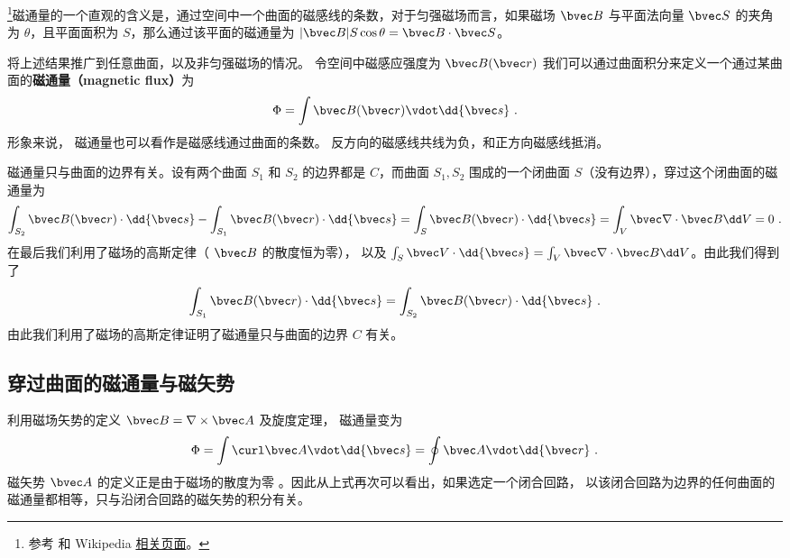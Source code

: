 
\begin{issues}
\issueDraft
{}
\end{issues}


\footnote{参考 \cite{GriffE} 和 Wikipedia \href{https://en.wikipedia.org/wiki/Magnetic_flux}{相关页面}。}磁通量的一个直观的含义是，通过空间中一个曲面的磁感线的条数，对于匀强磁场而言，如果磁场 $\bvec B$ 与平面法向量 $\bvec S$ 的夹角为 $\theta$，且平面面积为 $S$，那么通过该平面的磁通量为 $|\bvec B|S \cos\theta = \bvec B\cdot \bvec S$。

将上述结果推广到任意曲面，以及非匀强磁场的情况。
令空间中磁感应强度为 $\bvec B(\bvec r)$ 我们可以通过曲面积分来定义一个通过某曲面的\textbf{磁通量（magnetic flux）}为
\begin{equation}
\Phi  = \int \bvec B(\bvec r) \vdot \dd{\bvec s}~.
\end{equation}
形象来说， 磁通量也可以看作是磁感线通过曲面的条数。 反方向的磁感线共线为负，和正方向磁感线抵消。

磁通量只与曲面的边界有关。设有两个曲面 $S_1$ 和 $S_2$ 的边界都是 $C$，而曲面 $S_1,S_2$ 围成的一个闭曲面 $S$（没有边界），穿过这个闭曲面的磁通量为
\begin{equation}
\int_{S_2} \bvec B(\bvec r)\cdot \dd {\bvec s }- \int_{S_1} \bvec B(\bvec r)\cdot \dd {\bvec s} = \int_{S} \bvec B(\bvec r)\cdot \dd {\bvec s}=\int_V \bvec \nabla \cdot \bvec B \dd V=0~.
\end{equation}
在最后我们利用了磁场的高斯定律（ $\bvec B$ 的散度恒为零）， 以及 $\int_S \bvec V\cdot \dd{\bvec s}=\int_V \bvec \nabla\cdot \bvec B \dd V$。由此我们得到了
\begin{equation}
\int_{S_1} \bvec B(\bvec r)\cdot \dd {\bvec s}
=
\int_{S_2} \bvec B(\bvec r)\cdot \dd {\bvec s }~.
\end{equation}
由此我们利用了磁场的高斯定律证明了磁通量只与曲面的边界 $C$ 有关。
\subsection{穿过曲面的磁通量与磁矢势}
利用磁场矢势的定义 $\bvec B=\nabla\times \bvec A$ %
及旋度定理， %
磁通量变为
\begin{equation} \label{eq_BFlux_2}
\Phi  = \int \curl \bvec A \vdot \dd{\bvec s}  = \oint \bvec A \vdot \dd{\bvec r}~.
\end{equation}
磁矢势 $\bvec A$ 的定义正是由于磁场的散度为零%
。因此从上式再次可以看出，如果选定一个闭合回路， 以该闭合回路为边界的任何曲面的磁通量都相等，只与沿闭合回路的磁矢势的积分有关。
